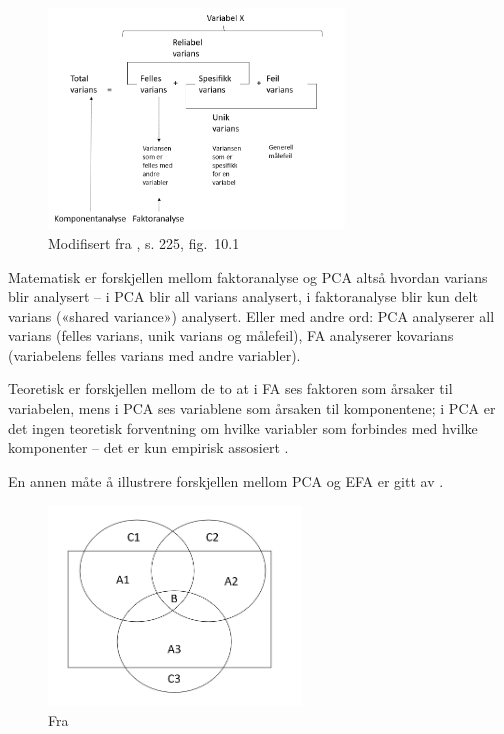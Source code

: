 \documentclass[
]{article}
\begin{document}
\begin{figure}
\centering
\includegraphics[width=0.7\textwidth,height=\textheight]{PCA-EFA-CFA.png}
\caption{Modifisert fra \citet{bjerkanFaktoranalyse2007b}, s. 225, fig.~10.1}
\end{figure}

Matematisk er forskjellen mellom faktoranalyse og PCA altså hvordan varians blir analysert -- i PCA blir all varians analysert, i faktoranalyse blir kun delt varians («shared variance») analysert. Eller med andre ord: PCA analyserer all varians (felles varians, unik varians og målefeil), FA analyserer kovarians (variabelens felles varians med andre variabler).

Teoretisk er forskjellen mellom de to at i FA ses faktoren som årsaker til variabelen, mens i PCA ses variablene som årsaken til komponentene; i PCA er det ingen teoretisk forventning om hvilke variabler som forbindes med hvilke komponenter -- det er kun empirisk assosiert \citep{tabachnikUsingMultivariateStatistics2007}.

En annen måte å illustrere forskjellen mellom PCA og EFA er gitt av \citet{bastosExploratoryFactorAnalysis2021}.

\begin{figure}
\centering
\includegraphics[width=0.6\textwidth,height=\textheight]{PCA-EFA.png}
\caption{Fra \citet{bastosExploratoryFactorAnalysis2021}}
\end{figure}
\end{document}
